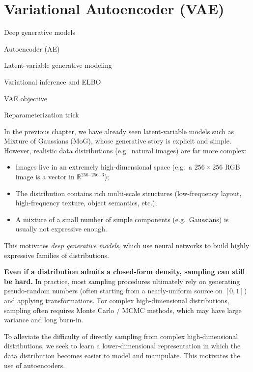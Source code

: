 \documentclass[../main]{subfiles}
\begin{document}
\chapter{Variational Autoencoder (VAE)}
\begin{introduction}
    \item Deep generative models
    \item Autoencoder (AE)
    \item Latent-variable generative modeling
    \item Variational inference and ELBO
    \item VAE objective
    \item Reparameterization trick
\end{introduction}

\graphicspath{{tikz/}{../tikz/}{../../tikz/}{../../mvp/tikz/}}

In the previous chapter, we have already seen latent-variable models such as
Mixture of Gaussians (MoG), whose generative story is explicit and simple.  
However, realistic data distributions (e.g.\ natural images) are far more complex:
\begin{itemize}
    \item Images live in an extremely high-dimensional space (e.g.\ a $256\times256$ RGB image is a vector in $\mathbb R^{256\cdot256\cdot 3}$);
    \item The distribution contains rich multi-scale structures (low-frequency layout, high-frequency texture, object semantics, etc.);
    \item A mixture of a small number of simple components (e.g.\ Gaussians) is usually not expressive enough.
\end{itemize}
This motivates \emph{deep generative models}, which use neural networks to build
highly expressive families of distributions.

\textbf{Even if a distribution admits a closed-form density, sampling can still be hard.}  
In practice, most sampling procedures ultimately rely on generating pseudo-random
numbers (often starting from a nearly-uniform source on $[0,1]$) and applying
transformations.  
For complex high-dimensional distributions, sampling often requires Monte Carlo /
MCMC methods, which may have large variance and long burn-in.

To alleviate the difficulty of directly sampling from complex high-dimensional distributions, we seek to learn a lower-dimensional representation in which the data distribution becomes easier to model and manipulate. This motivates the use of autoencoders.
\end{document}
